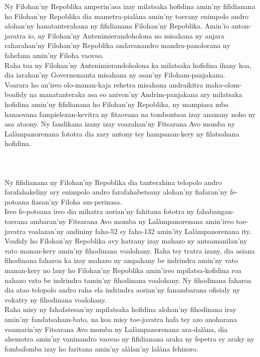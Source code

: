 \documentclass[12pt]{article}
\newcounter{laharana}
\newcommand{\andininy}[0]{
  \paragraph{%
    \NoCaseChange{%
      Andininy~\addtocounter{laharana}{1}\thelaharana.}\label{and:\thelaharana}~%
  }%
}
\begin{document}
\noindent
Ny Filohan'ny Repoblika amperin'asa izay milatsaka hofidina amin'ny fifidianana
ho Filohan'ny Repoblika dia mametra-pialàna amin'ny toerany enimpolo andro
alohan'ny hanatanterahana ny fifidianana Filohan'ny Repoblika. Amin'io
anton-javatra io, ny Filohan'ny Antenimierandoholona no misahana ny anjara
raharahan'ny Filohan'ny Repoblika andavanandro mandra-panolorana ny fahefana
amin'ny Filoha vaovao.\\

\noindent
Raha toa ny Filohan'ny Antenimierandoholona ka milatsaka hofidina ihany koa, dia
iarahan'ny Governemanta misahana ny asan'ny Filoham-panjakana.\\

\noindent
Voarara ho an'ireo olo-manan-kaja rehetra misahana andraikitra maha-olom-boafidy
na manatanteraka asa eo anivon'ny Andrim-panjakana ary milatsaka hofidina
amin'ny fifidianana ho Filohan'ny Repoblika, ny mampiasa mba hanaovana
fampielezan-kevitra ny fitaovana na tombontsoa izay ananany noho ny asa
ataony. Ny fandikana izany izay voazahan'ny Fitsarana Avo momba ny
Lalàmpanorenana fototra dia zary antony tsy hampanan-kery ny filatsahana
hofidina.

\andininy{}Ny fifidianana ny Filohan'ny Repoblika dia tanterahina telopolo
andro farafahakeliny ary enimpolo andro farafahabetsany alohan'ny fiafaran'ny
fe-potoana fiasan'ny Filoha am-perinasa.\\

\noindent
Ireo fe-potoana ireo dia mihatra aorian'ny fahitana fototra ny
fahabangan-toerana ambaran'ny Fitsarana Avo momba ny Lalàmpanorenana amin'ireo
toe-javatra voalazan'ny andininy faha-52 sy faha-132 amin'ity Lalàmpanorenana
ity.\\

\noindent
Voafidy ho Filohan'ny Repoblika avy hatrany izay mahazo ny antsamanilan'ny vato
manan-kery amin'ny fihodinana voalohany. Raha tsy tratra izany, dia asiana
fihodinana faharoa ka izay mahazo ny ampahany be indrindra amin'ny vato
manan-kery no lany ho Filohan'ny Repoblika amin'ireo mpilatsa-kofidina roa
nahazo vato be indrindra tamin'ny fihodinana voalohany. Ny fihodinana faharoa
dia atao telopolo andro raha ela indrindra aorian'ny fanambarana ofisialy ny
vokatry ny fihodinana voalohany.\\

\noindent
Raha misy ny fahafatesan'ny mpilatsaka hofidina alohan'ny fihodinana iray
amin'ny fandatsaham-bato, na koa misy toe-javatra hafa tsy azo anoharana
voamarin'ny Fitsarana Avo momba ny Lalàmpanorenana ara-dalàna, dia ahemotra
amin'ny vaninandro vaovao ny fifidianana araka ny fepetra sy araky ny fombafomba
izay ho faritana amin'ny alàlan'ny lalàna fehizoro.\\
\end{document}
